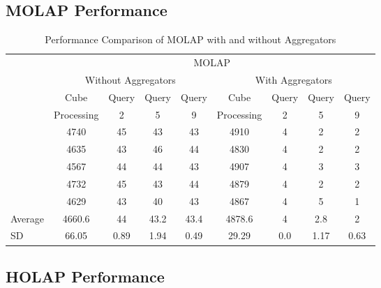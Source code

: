 \documentclass[a4paper,12pt]{article} %
\begin{document}
\subsection{MOLAP Performance}

\begin{table}[H]
\centering
\caption{Performance Comparison of MOLAP with and without Aggregators}
\label{tab:molap_performance}
\begin{tabular}{lcccccccc}
\toprule
& \multicolumn{8}{c}{MOLAP} \\
\cmidrule(lr){2-9}
& \multicolumn{4}{c}{Without Aggregators} & \multicolumn{4}{c}{With Aggregators} \\
\cmidrule(lr){2-9}
& Cube & Query & Query & Query & Cube & Query & Query & Query \\
& Processing & 2 & 5 & 9 & Processing & 2 & 5 & 9 \\
\midrule
& 4740 & 45 & 43 & 43 & 4910 & 4 & 2 & 2 \\
& 4635 & 43 & 46 & 44 & 4830 & 4 & 2 & 2 \\
& 4567 & 44 & 44 & 43 & 4907 & 4 & 3 & 3 \\
& 4732 & 45 & 43 & 44 & 4879 & 4 & 2 & 2 \\
& 4629 & 43 & 40 & 43 & 4867 & 4 & 5 & 1 \\
\midrule
Average & 4660.6 & 44 & 43.2 & 43.4 & 4878.6 & 4 & 2.8 & 2 \\
SD & 66.05 & 0.89 & 1.94 & 0.49 & 29.29 & 0.0 & 1.17 & 0.63 \\
\bottomrule
\end{tabular}
\end{table}

\subsection{HOLAP Performance}
\end{document}
